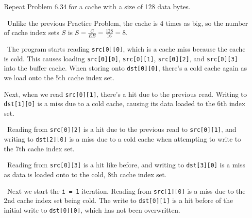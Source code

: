 \documentclass[12pt]{article}
\newenvironment{ex}[2][Exercise]{\begin{trivlist}
		\item[\hskip \labelsep {\bfseries #1}\hskip \labelsep {\bfseries #2.}]}{\end{trivlist}}
\newenvironment{sol}[1][Solution]{\begin{trivlist}
		\item[\hskip \labelsep {\bfseries #1:}]}{\end{trivlist}}
\begin{document}
\begin{ex}{6.35}
	Repeat Problem 6.34 for a cache with a size of 128 data bytes.
\end{ex}

\begin{sol}
	\
	Unlike the previous Practice Problem, the cache is 4 times as big, so the number of cache index sets
	$S$ is $S=\frac{C}{EB}=\frac{128}{16}=8$.
	
	\
	The program starts reading \texttt{src[0][0]}, which is a cache miss because the cache is cold. This
	causes loading \texttt{src[0][0]}, \texttt{src[0][1]}, \texttt{src[0][2]}, and \texttt{src[0][3]} into the
	buffer cache. When storing onto \texttt{dst[0][0]}, there's a cold cache again as we load onto the
	5th cache index set.
	
	Next, when we read \texttt{src[0][1]}, there's a hit due to the previous read.
	Writing to \texttt{dst[1][0]} is a miss due to a cold cache, causing its data loaded to the 6th
	index set.
	
	\
	Reading from \texttt{src[0][2]} is a hit due to the previous read to \texttt{src[0][1]}, and writing to
	\texttt{dst[2][0]} is a miss due to a cold cache when attempting to write to the 7th cache index set.
	
	\
	Reading from \texttt{src[0][3]} is a hit like before, and writing to \texttt{dst[3][0]} is a miss as
	data is loaded onto to the cold, 8th cache index set.
	
	\
	Next we start the \texttt{i = 1} iteration. Reading from \texttt{src[1][0]} is a miss due to the
	2nd cache index set being cold. The write to \texttt{dst[0][1]} is a hit before of the initial write
	to \texttt{dst[0][0]}, which has not been overwritten.
	

\end{sol}
\end{document}
